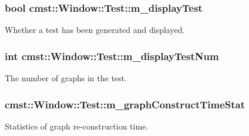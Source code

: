 \subsubsection[{\texorpdfstring{m\+\_\+display\+Test}{m_displayTest}}]{\setlength{\rightskip}{0pt plus 5cm}bool cmst\+::\+Window\+::\+Test\+::m\+\_\+display\+Test}\hypertarget{structcmst_1_1_window_1_1_test_a6e01140b018e7c479b15ae6499d8b9e8}{}\label{structcmst_1_1_window_1_1_test_a6e01140b018e7c479b15ae6499d8b9e8}


Whether a test has been generated and displayed. 

\subsubsection[{\texorpdfstring{m\+\_\+display\+Test\+Num}{m_displayTestNum}}]{\setlength{\rightskip}{0pt plus 5cm}int cmst\+::\+Window\+::\+Test\+::m\+\_\+display\+Test\+Num}\hypertarget{structcmst_1_1_window_1_1_test_a0968826c727c33df28c160c4095e0b2f}{}\label{structcmst_1_1_window_1_1_test_a0968826c727c33df28c160c4095e0b2f}


The number of graphs in the test. 

\subsubsection[{\texorpdfstring{m\+\_\+graph\+Construct\+Time\+Stat}{m_graphConstructTimeStat}}]{ cmst\+::\+Window\+::\+Test\+::m\+\_\+graph\+Construct\+Time\+Stat}\hypertarget{structcmst_1_1_window_1_1_test_a4ff72191889ff43d7d80517120a97fae}{}\label{structcmst_1_1_window_1_1_test_a4ff72191889ff43d7d80517120a97fae}


Statistics of graph re-\/construction time. 

